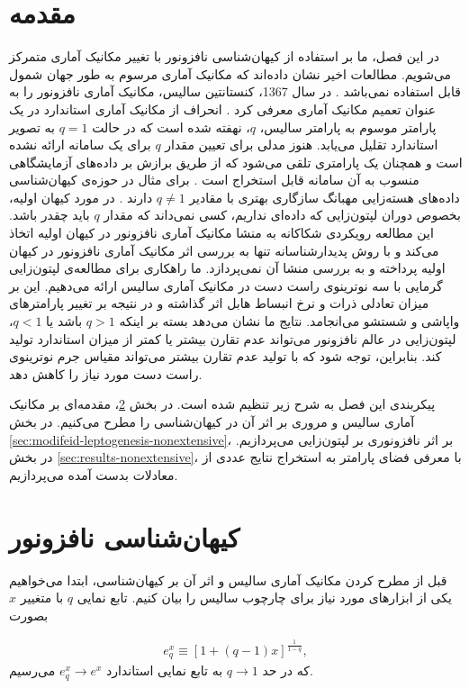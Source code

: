 \documentclass[a4paper]{book}
\begin{document}
\section{مقدمه}
در این فصل، ما بر استفاده از کیهان‌شناسی نافزونور با تغییر مکانیک آماری متمرکز می‌شویم. مطالعات اخیر نشان داده‌اند که مکانیک آماری مرسوم به طور جهان شمول قابل استفاده نمی‌باشد \cite{abe_nonextensive_2001,tsallis_introduction_2023}.
در سال 1367، کنستانتین سالیس، مکانیک آماری نافزونور را به عنوان تعمیم مکانیک آماری معرفی کرد \cite{Tsallis:1999nq,Tsallis:1987eu}.
انحراف از مکانیک آماری استاندارد در یک پارامتر موسوم به پارامتر سالیس، {\footnotesize$q$}، نهفته شده است که در حالت {\footnotesize$q=1$} به تصویر استاندارد تقلیل می‌یابد.
هنوز مدلی برای تعیین مقدار {\footnotesize$q$} برای یک سامانه ارائه نشده است و همچنان یک پارامتری تلقی می‌شود که از طریق برازش بر داده‌های آزمایشگاهی منسوب به آن سامانه قابل استخراج است \cite{tsallis_introduction_2023}.
برای مثال در حوزه‌ی کیهان‌شناسی داده‌های هسته‌زایی مهبانگ سازگاری بهتری با مقادیر {\footnotesize$q\neq1$} دارند \cite{Jizba:2023fkp,Hou:2017uap,Bertulani:2012sv}.
در مورد کیهان اولیه، بخصوص دوران لپتون‌زایی که داده‌ای نداریم، کسی نمی‌داند که مقدار {\footnotesize$q$} باید چقدر باشد.
این مطالعه رویکردی شکاکانه به منشا مکانیک آماری نافزونور در کیهان اولیه اتخاذ می‌کند و با روش پدیدارشناسانه تنها به بررسی اثر مکانیک آماری نافزونور در کیهان اولیه پرداخته و به بررسی منشا آن نمی‌پردازد.
ما راهکاری برای مطالعه‌ی لپتون‌زایی گرمایی با سه نوترینوی راست دست در مکانیک آماری سالیس ارائه می‌دهیم. این بر میزان تعادلی ذرات و نرخ انبساط هابل اثر گذاشته و در نتیجه بر تغییر پارامتر‌های واپاشی و شستشو می‌انجامد. نتایج ما نشان می‌دهد بسته بر اینکه {\footnotesize$q>1$} باشد یا {\footnotesize$q<1$}، لپتون‌زایی در عالم نافزونور می‌تواند عدم تقارن بیشتر یا کمتر از میزان استاندارد تولید کند. بنابراین، توجه شود که با تولید عدم تقارن بیشتر می‌تواند مقیاس جرم نوترینوی راست دست مورد نیاز را کاهش دهد.

پیکربندی این فصل به شرح زیر تنظیم شده است. در بخش \ref{sec:nonextensive}، مقدمه‌ای بر مکانیک آماری سالیس و مروری بر اثر آن در کیهان‌شناسی را مطرح می‌کنیم. در بخش \ref{sec:modifeid-leptogenesis-nonextensive}، بر اثر نافزونوری بر لپتون‌زایی می‌پردازیم. در بخش \ref{sec:results-nonextensive}، با معرفی فضای پارامتر به استخراج نتایج عددی از معادلات بدست آمده می‌پردازیم.

\section{کیهان‌شناسی نافزونور}
\label{sec:nonextensive}
قبل از مطرح کردن مکانیک آماری سالیس و اثر آن بر کیهان‌شناسی، ابتدا می‌خواهیم یکی از ابزارهای مورد نیاز برای چارچوب سالیس را بیان کنیم. تابع نمایی {\footnotesize$q$} با متغییر {\footnotesize$x$} بصورت \cite{tsallis_introduction_2023}
\par
\vspace{-0.5cm}
{\footnotesize\begin{align}
	e_q^x \equiv \left[1+\left(q-1\right)x\right]^{\frac{1}{1-q}},
\end{align}}
که در حد {\footnotesize$q\to 1$} به تابع نمایی استاندارد {\footnotesize$e_q^x \to e^x$} می‌رسیم.
\end{document}
